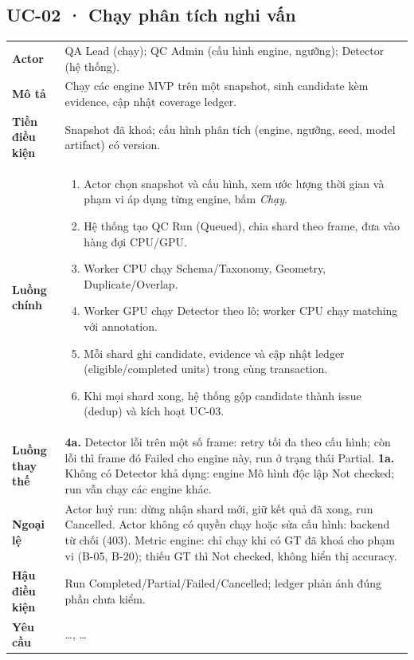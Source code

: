 \subsection*{UC-02 · Chạy phân tích nghi vấn}
\begin{xltabular}{\linewidth}{@{}>{\bfseries}L{3.2cm}Y@{}}
\toprule
Actor & QA Lead (chạy); QC Admin (cấu hình engine, ngưỡng); Detector (hệ thống).\\
Mô tả & Chạy các engine MVP trên một snapshot, sinh candidate kèm evidence, cập nhật coverage ledger.\\
Tiền điều kiện & Snapshot đã khoá; cấu hình phân tích (engine, ngưỡng, seed, model artifact) có version.\\
Luồng chính &
\begin{enumerate}[nosep]
  \item Actor chọn snapshot và cấu hình, xem ước lượng thời gian và phạm vi áp dụng từng engine, bấm \emph{Chạy}.
  \item Hệ thống tạo QC Run (Queued), chia shard theo frame, đưa vào hàng đợi CPU/GPU.
  \item Worker CPU chạy Schema/Taxonomy, Geometry, Duplicate/Overlap.
  \item Worker GPU chạy Detector theo lô; worker CPU chạy matching với annotation.
  \item Mỗi shard ghi candidate, evidence và cập nhật ledger (eligible/completed units) trong cùng transaction.
  \item Khi mọi shard xong, hệ thống gộp candidate thành issue (dedup) và kích hoạt UC-03.
\end{enumerate}\\
Luồng thay thế &
\textbf{4a.} Detector lỗi trên một số frame: retry tối đa theo cấu hình; còn lỗi thì frame đó Failed cho engine này, run ở trạng thái Partial.\newline
\textbf{1a.} Không có Detector khả dụng: engine Mô hình độc lập Not checked; run vẫn chạy các engine khác.\\
Ngoại lệ & Actor huỷ run: dừng nhận shard mới, giữ kết quả đã xong, run Cancelled.\newline
Actor không có quyền chạy hoặc sửa cấu hình: backend từ chối (403).\newline
Metric engine: chỉ chạy khi có GT đã khoá cho phạm vi (B-05, B-20); thiếu GT thì Not checked, không hiển thị accuracy.\\
Hậu điều kiện & Run Completed/Partial/Failed/Cancelled; ledger phản ánh đúng phần chưa kiểm.\\
Yêu cầu & …, …\\
\bottomrule
\end{xltabular}

